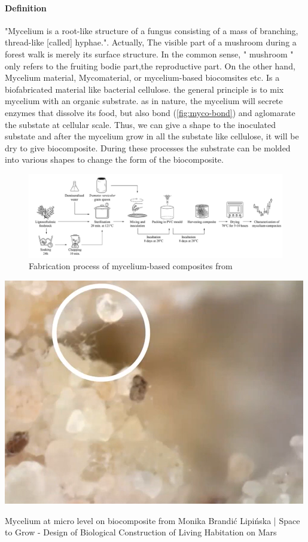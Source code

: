 \paragraph[short]{Definition}
"Mycelium is a root-like structure of a fungus consisting of a mass of branching, thread-like [called] hyphae."\cite{wikipediaMycelium}. Actually, The visible part of a mushroom during a forest walk is merely its surface structure. In the common sense, " mushroom " only refers to the fruiting bodie part,the reproductive part. 
On the other hand, Mycelium material, Mycomaterial, or mycelium-based biocomsites etc. Is a biofabricated material like bacterial cellulose. the general principle is to mix mycelium with an organic substrate. as in nature, the mycelium will secrete enzymes that dissolve its food, but also bond\cite{MonikaBrandićLipińskaHBBE} (\ref{fig:myco-bond}) and aglomarate the substate at cellular scale. 
Thus, we can give a shape to the inoculated substate and after the mycelium grow in all the substate like cellulose, it will be dry to give biocomposite. During these processes the substrate can be molded into various shapes to change the form of the biocomposite. 

\begin{figure}[h]
    \centering
    \includegraphics{images/Fabrication_process.png}
    \caption{Fabrication process of mycelium-based composites from  \cite{elsacker2019mechanical}}
    \label{fig:ecovative}
\end{figure} 

\begin{marginfigure}
    \centering
    \includegraphics{images/bond-mycelium.png}    
    \caption{Mycelium at micro level on biocomposite from  Monika Brandić Lipińska | Space to Grow - Design of Biological Construction of Living Habitation on Mars}
    \label{fig:myco-bond}
\end{marginfigure}

